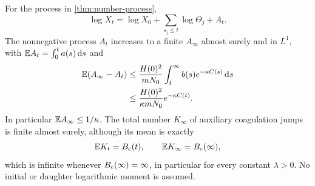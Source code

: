 \begin{theorem}
\label{thm:controlled-path}
For the process in \cref{thm:number-process},
\begin{equation}
 \log X_t=\log X_0+\sum_{s_j\leq t}\log\Theta_j+A_t.
 \label{eq:path-log-identity}
\end{equation}
The nonnegative process $A_t$ increases to a finite $A_\infty$ almost
surely and in $L^1$, with $\mathbb E A_t=\int_0^t a(s)\,\mathrm d s$ and
\begin{align}
 \mathbb E(A_\infty-A_t)
 &\leq\frac{H(0)^2}{mN_0}
                  \int_t^\infty b(s)e^{-\kappa C(s)}\,\mathrm d s\notag\\
 &\leq\frac{H(0)^2}{\kappa mN_0}e^{-\kappa C(t)}.
 \label{eq:controlled-log-tail}
\end{align}
In particular $\mathbb E A_\infty\leq1/\kappa$.
The total number $K_\infty$ of auxiliary coagulation jumps is finite
almost surely, although its mean is exactly
\begin{equation}
 \mathbb E K_t=B_{\mathrm c}(t),\qquad \mathbb E K_\infty=B_{\mathrm c}(\infty),
 \label{eq:coag-count-mean}
\end{equation}
which is infinite whenever $B_{\mathrm c}(\infty)=\infty$, in particular for
every constant $\lambda>0$. No initial or daughter logarithmic moment
is assumed.
\end{theorem}

